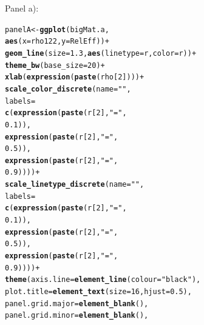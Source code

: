 \documentclass{article}\usepackage[]{graphicx}\usepackage[]{color}
\makeatletter
\newcommand{\hlnum}[1]{\textcolor[rgb]{0.686,0.059,0.569}{#1}}%
\newcommand{\hlstr}[1]{\textcolor[rgb]{0.192,0.494,0.8}{#1}}%
\newcommand{\hlopt}[1]{\textcolor[rgb]{0,0,0}{#1}}%
\newcommand{\hlstd}[1]{\textcolor[rgb]{0.345,0.345,0.345}{#1}}%
\newcommand{\hlkwb}[1]{\textcolor[rgb]{0.69,0.353,0.396}{#1}}%
\newcommand{\hlkwc}[1]{\textcolor[rgb]{0.333,0.667,0.333}{#1}}%
\newcommand{\hlkwd}[1]{\textcolor[rgb]{0.737,0.353,0.396}{\textbf{#1}}}%
\newenvironment{kframe}{%
 \def\at@end@of@kframe{}%
 \ifinner\ifhmode%
  \def\at@end@of@kframe{\end{minipage}}%
  \begin{minipage}{\columnwidth}%
 \fi\fi%
 \def\FrameCommand##1{\hskip\@totalleftmargin \hskip-\fboxsep
 \colorbox{shadecolor}{##1}\hskip-\fboxsep
     \hskip-\linewidth \hskip-\@totalleftmargin \hskip\columnwidth}%
 \MakeFramed {\advance\hsize-\width
   \@totalleftmargin\z@ \linewidth\hsize
   \@setminipage}}%
 {\par\unskip\endMakeFramed%
 \at@end@of@kframe}
\newenvironment{knitrout}{}{} %
\makeatother
\begin{document}
Panel a):
\begin{knitrout}
\color{fgcolor}\begin{kframe}
\begin{alltt}
\hlstd{panelA} \hlkwb{<-} \hlkwd{ggplot}\hlstd{(bigMat.a,}
                 \hlkwd{aes}\hlstd{(}\hlkwc{x}\hlstd{=rho122,} \hlkwc{y}\hlstd{=RelEff))} \hlopt{+}
  \hlkwd{geom_line}\hlstd{(}\hlkwc{size}\hlstd{=}\hlnum{1.3}\hlstd{,} \hlkwd{aes}\hlstd{(}\hlkwc{linetype}\hlstd{=r,} \hlkwc{color}\hlstd{=r))} \hlopt{+}
  \hlkwd{theme_bw}\hlstd{(}\hlkwc{base_size} \hlstd{=} \hlnum{20}\hlstd{)}\hlopt{+}
  \hlkwd{xlab}\hlstd{(}\hlkwd{expression}\hlstd{(}\hlkwd{paste}\hlstd{(rho[}\hlnum{2}\hlstd{])))} \hlopt{+}
  \hlkwd{scale_color_discrete}\hlstd{(}\hlkwc{name} \hlstd{=} \hlstr{""}\hlstd{,}
                       \hlkwc{labels} \hlstd{=}
                         \hlkwd{c}\hlstd{(}\hlkwd{expression}\hlstd{(}\hlkwd{paste}\hlstd{(r[}\hlnum{2}\hlstd{],} \hlstr{"="}\hlstd{,}
                                            \hlnum{0.1}\hlstd{)),}
                           \hlkwd{expression}\hlstd{(}\hlkwd{paste}\hlstd{(r[}\hlnum{2}\hlstd{],} \hlstr{"="}\hlstd{,}
                                            \hlnum{0.5}\hlstd{)),}
                           \hlkwd{expression}\hlstd{(}\hlkwd{paste}\hlstd{(r[}\hlnum{2}\hlstd{],} \hlstr{"="}\hlstd{,}
                                            \hlnum{0.9}\hlstd{))))} \hlopt{+}
  \hlkwd{scale_linetype_discrete}\hlstd{(}\hlkwc{name} \hlstd{=} \hlstr{""}\hlstd{,}
                          \hlkwc{labels} \hlstd{=}
                            \hlkwd{c}\hlstd{(}\hlkwd{expression}\hlstd{(}\hlkwd{paste}\hlstd{(r[}\hlnum{2}\hlstd{],} \hlstr{"="}\hlstd{,}
                                               \hlnum{0.1}\hlstd{)),}
                              \hlkwd{expression}\hlstd{(}\hlkwd{paste}\hlstd{(r[}\hlnum{2}\hlstd{],} \hlstr{"="}\hlstd{,}
                                               \hlnum{0.5}\hlstd{)),}
                              \hlkwd{expression}\hlstd{(}\hlkwd{paste}\hlstd{(r[}\hlnum{2}\hlstd{],} \hlstr{"="}\hlstd{,}
                                               \hlnum{0.9}\hlstd{))))} \hlopt{+}
  \hlkwd{theme}\hlstd{(}\hlkwc{axis.line} \hlstd{=} \hlkwd{element_line}\hlstd{(}\hlkwc{colour} \hlstd{=} \hlstr{"black"}\hlstd{),}
        \hlkwc{plot.title} \hlstd{=} \hlkwd{element_text}\hlstd{(}\hlkwc{size} \hlstd{=} \hlnum{16}\hlstd{,} \hlkwc{hjust} \hlstd{=} \hlnum{0.5}\hlstd{),}
        \hlkwc{panel.grid.major} \hlstd{=} \hlkwd{element_blank}\hlstd{(),}
        \hlkwc{panel.grid.minor} \hlstd{=} \hlkwd{element_blank}\hlstd{(),}

\end{alltt}
\end{kframe}
\end{knitrout}
\end{document}

